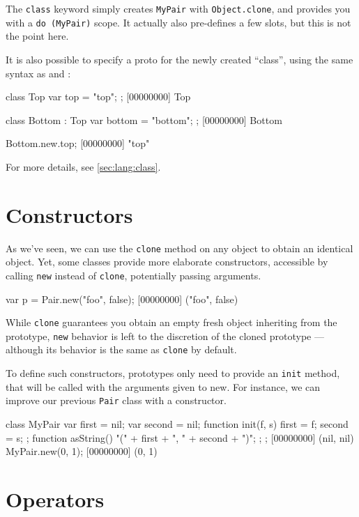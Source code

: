 The \lstinline{class} keyword simply creates \lstinline|MyPair| with
\lstinline|Object.clone|, and provides you with a \lstinline|do (MyPair)|
scope. It actually also pre-defines a few slots, but this is not the point
here.

It is also possible to specify a proto for the newly created ``class'',
using the same syntax as \Java and \Cxx:

\begin{urbiscript}
class Top
{
  var top = "top";
};
[00000000] Top

class Bottom : Top
{
  var bottom = "bottom";
};
[00000000] Bottom

Bottom.new.top;
[00000000] "top"
\end{urbiscript}

For more details, see \autoref{sec:lang:class}.

\section{Constructors}
\label{sec:tut:ctor}
As we've seen, we can use the \lstinline|clone| method on any object to
obtain an identical object. Yet, some classes provide more elaborate
constructors, accessible by calling \lstinline{new} instead of
\lstinline{clone}, potentially passing arguments.

\begin{urbiscript}[firstnumber=1]
var p = Pair.new("foo", false);
[00000000] ("foo", false)
\end{urbiscript}

While \lstinline{clone} guarantees you obtain an empty fresh object
inheriting from the prototype, \lstinline{new} behavior is left to the
discretion of the cloned prototype --- although its behavior is the same as
\lstinline{clone} by default.

To define such constructors, prototypes only need to provide an
\lstinline{init} method, that will be called with the arguments given to
new. For instance, we can improve our previous \lstinline{Pair} class with a
constructor.

\begin{urbiscript}[firstnumber=1]
class MyPair
{
  var first = nil;
  var second = nil;
  function init(f, s) { first = f;   second = s;  };
  function asString() { "(" + first + ", " + second + ")"; };
};
[00000000] (nil, nil)
MyPair.new(0, 1);
[00000000] (0, 1)
\end{urbiscript}

\section{Operators}
\label{sec:tut:operators}

